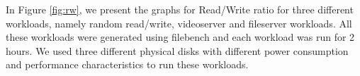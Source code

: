 In Figure \ref{fig:rw}, we present the graphs for Read/Write ratio for
three different workloads, namely random read/write, videoserver and
fileserver workloads. All these workloads were generated using
filebench and each workload was run for 2 hours. We used three
different physical disks with different power consumption and
performance characteristics to run these workloads.   

